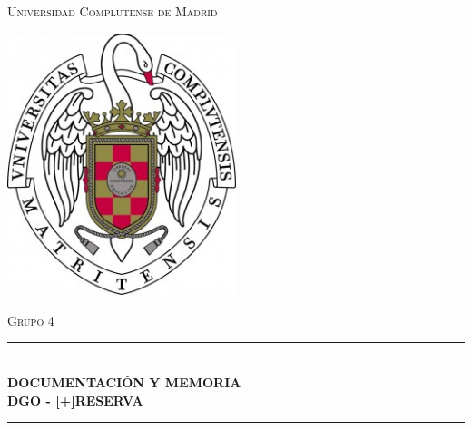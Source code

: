 \documentclass[12pt]{article}
\begin{document}
\begin{titlepage}

\newcommand{\HRule}{\rule{\linewidth}{0.5mm}} 

\center %
 
 

\textsc{\LARGE Universidad Complutense de Madrid}\\[0.1cm] %

\begin{center}
	\centering
	\includegraphics[width=0.5\textwidth]{logo}
\end{center}
 
 

\textsc{\LARGE Grupo 4}\\[0.1cm] %



\HRule \\[0.4cm]
{ \huge \bfseries DOCUMENTACIÓN Y MEMORIA }\\[0.4cm] %
{ \huge \bfseries DGO - [+]RESERVA}\\[0.2cm] %
\HRule \\[1.2cm]
 

\end{titlepage}
\end{document}

